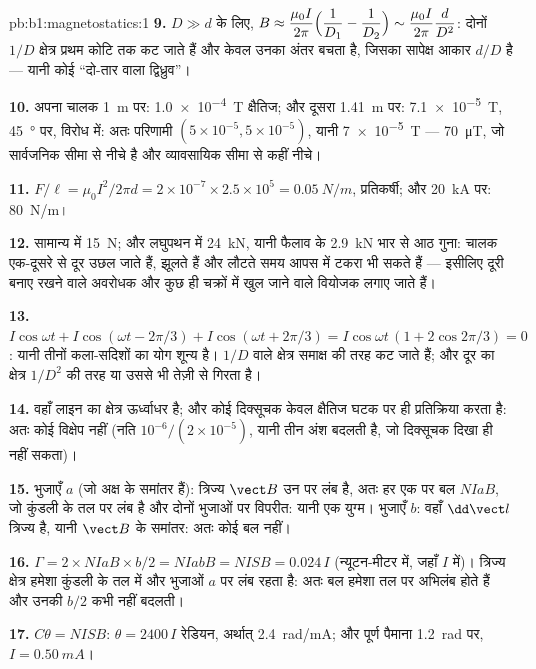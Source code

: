 \begin{solution}{pb:b1:magnetostatics:1}
\textbf{9.} $D \gg d$ के लिए, $B \approx \dfrac{\mu_0I}{2\pi}\Bigl(\dfrac1{D_1} - \dfrac1{D_2}\Bigr)
\sim \dfrac{\mu_0I}{2\pi}\dfrac{d}{D^2}$: दोनों $1/D$ क्षेत्र प्रथम कोटि तक कट
जाते हैं और केवल उनका अंतर बचता है, जिसका सापेक्ष आकार $d/D$ है --- यानी कोई
``दो-तार वाला द्विध्रुव''।

\textbf{10.} अपना चालक \qty{1}{m} पर: \qty{1.0e-4}{T} क्षैतिज; और दूसरा
\qty{1.41}{m} पर: \qty{7.1e-5}{T}, \qty{45}{\degree} पर, विरोध में: अतः परिणामी
$(5 \times 10^{-5}, 5 \times 10^{-5})$, यानी \qty{7e-5}{T} --- \qty{70}{\micro T}, जो
सार्वजनिक सीमा से नीचे है और व्यावसायिक सीमा से कहीं नीचे।

\textbf{11.} $F/\ell = \mu_0I^2/2\pi d = 2 \times 10^{-7} \times 2.5 \times 10^5 =
\qty{0.05}{N/m}$, प्रतिकर्षी; और \qty{20}{kA} पर: \qty{80}{N/m}।

\textbf{12.} सामान्य में \qty{15}{N}; और लघुपथन में \qty{24}{kN}, यानी फैलाव
के \qty{2.9}{kN} भार से आठ गुना: चालक एक-दूसरे से दूर उछल जाते हैं, झूलते
हैं और लौटते समय आपस में टकरा भी सकते हैं --- इसीलिए दूरी बनाए रखने वाले
अवरोधक और कुछ ही चक्रों में खुल जाने वाले वियोजक लगाए जाते हैं।

\textbf{13.} $I\cos\omega t + I\cos(\omega t - 2\pi/3) + I\cos(\omega t + 2\pi/3) =
I\cos\omega t\,(1 + 2\cos2\pi/3) = 0$: यानी तीनों कला-सदिशों का योग शून्य है।
$1/D$ वाले क्षेत्र समाक्ष की तरह कट जाते हैं; और दूर का क्षेत्र $1/D^2$ की
तरह या उससे भी तेज़ी से गिरता है।

\textbf{14.} वहाँ लाइन का क्षेत्र ऊर्ध्वाधर है; और कोई दिक्सूचक केवल क्षैतिज
घटक पर ही प्रतिक्रिया करता है: अतः कोई विक्षेप नहीं (नति
$10^{-6}/(2 \times 10^{-5})$, यानी तीन अंश बदलती है, जो दिक्सूचक दिखा ही नहीं सकता)।

\textbf{15.} भुजाएँ $a$ (जो अक्ष के समांतर हैं): त्रिज्य $\vect B$ उन पर
लंब है, अतः हर एक पर बल $NIaB$, जो कुंडली के तल पर लंब है और दोनों भुजाओं पर
विपरीत: यानी एक युग्म। भुजाएँ $b$: वहाँ $\dd\vect l$
त्रिज्य है, यानी $\vect B$ के समांतर: अतः कोई बल नहीं।

\textbf{16.} $\Gamma = 2 \times NIaB \times b/2 = NIabB = NISB = 0.024\,I$ (न्यूटन-मीटर में, जहाँ $I$
 में)। त्रिज्य क्षेत्र हमेशा कुंडली के तल में और भुजाओं $a$ पर लंब
रहता है: अतः बल हमेशा तल पर अभिलंब होते हैं और उनकी  $b/2$ कभी
नहीं बदलती।

\textbf{17.} $C\theta = NISB$: $\theta = 2400\,I$ रेडियन, अर्थात् \qty{2.4}{rad/mA}; और पूर्ण
पैमाना \qty{1.2}{rad} पर, $I = \qty{0.50}{mA}$।


\end{solution}
